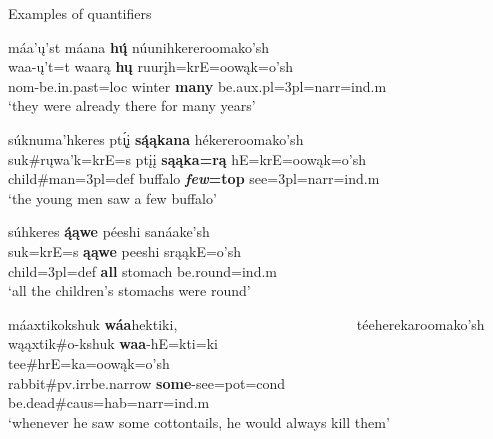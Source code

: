 \begin{exe}

\item\label{ExamplesOfQuantifiers} Examples of quantifiers

\begin{xlist}

\item\label{ExamplesOfQuantifiers1} \glll máa'ų'st máana \textbf{hų́} núunihkereroomako'sh\\
    waa-ų't=t waarą \textbf{hų} ruurįh=krE=oowąk=o'sh\\
    nom-\textnormal{be.in.past}=loc \textnormal{winter} \textbf{\textnormal{\bfseries many}} \textnormal{be}.aux.pl=3pl=narr=ind.m\\
    \glt `they were already there for many years' \citep[220]{hollow1973a}
    
\item\label{ExamplesOfQuantifiers2} \glll  súknuma'hkeres pt\'{ı̨}į \textbf{są́ąkana} hékereroomako'sh\\
    suk\#rųwa'k=krE=s ptįį \textbf{sąąka=rą} hE=krE=oowąk=o'sh\\
    \textnormal{child}\#\textnormal{man}=3pl=def \textnormal{buffalo} \textbf{\textit{\bfseries few}=top} \textnormal{see}=3pl=narr=ind.m\\
    \glt `the young men saw a few buffalo' \citep[79]{hollow1973b}
    
\item\label{ExamplesOfQuantifiers3} \glll súhkeres \textbf{ą́ąwe} péeshi sanáake'sh\\
    suk=krE=s \textbf{ąąwe} peeshi srąąkE=o'sh\\
    \textnormal{child}=3pl=def \textbf{\textnormal{\bfseries all}} \textnormal{stomach} \textnormal{be.round}=ind.m\\
    \glt `all the children's stomachs were round' \citep[81]{hollow1973b}
    
\item\label{ExamplesOfQuantifiers4} \glll máaxtikokshuk \textbf{wáa}hektiki, ~ ~ ~ ~ ~ ~ ~ ~ ~ ~ ~ ~ ~ ~ ~ téeherekaroomako'sh\\
    wąąxtik\#o-kshuk \textbf{waa}-hE=kti=ki ~ ~ ~ ~ ~ ~ ~ ~ ~ ~ ~ ~ ~ ~ ~  tee\#hrE=ka=oowąk=o'sh\\
    \textnormal{rabbit}\#pv.irr\textnormal{be.narrow} \textbf{\textnormal{\bfseries some}}-\textnormal{see}=pot=cond ~ ~ ~ ~ ~ ~ ~ ~ ~ ~ ~ ~ ~ ~ ~ \textnormal{be.dead}\#caus=hab=narr=ind.m\\
    \glt `whenever he saw some cottontails, he would always kill them' \citep[196]{hollow1973a}

\end{xlist}

\end{exe}


